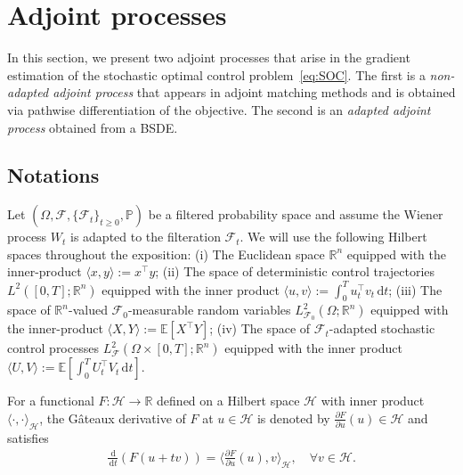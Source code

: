 \documentclass[letterpaper, 10 pt, conference]{ieeeconf}  %
\def\Re{\mathbb{R}}
\newcommand{\field}[1]{\mathbb{#1}}
\def\Re{\field{R}}
\def\Expect{{\mathbb E}}
\newcommand{\ud}{\,\mathrm{d}}
\def\Re{\mathbb{R}}
\renewcommand{\Re}{\mathbb{R}}
\begin{document}
\section{Adjoint processes}\label{sec:adjoint}
In this section, we present two adjoint processes that arise in the gradient estimation of the stochastic optimal control problem~\eqref{eq:SOC}.  
The first is a \emph{non-adapted adjoint process} that appears in adjoint matching methods and is obtained via pathwise differentiation of the objective.  
The second is an \emph{adapted adjoint process} obtained from a BSDE.  

\subsection{Notations} 
Let $(\Omega,\mathcal F, \{\mathcal F_t\}_{t\geq 0}, \mathbb P)$ be a filtered probability space and assume the Wiener process $W_t$ is adapted to the filteration $\mathcal F_t$. We will use the following Hilbert spaces throughout the exposition: (i) The  Euclidean space $\Re^n$ equipped with the inner-product $\langle x,y\rangle:=x^\top y$; (ii) The space of deterministic control trajectories $L^2([0,T];\mathbb R^n)$ equipped with the  inner product $\langle u,v \rangle := \int_0^T u_t^\top v_t \ud t$; (iii) The space of $\Re^n$-valued $\mathcal F_0$-measurable random variables $L^2_{\mathcal F_0}(\Omega;\Re^n)$ equipped with the inner-product $\langle X,Y \rangle := \Expect[X^\top Y]$; (iv) The space of $\mathcal F_t$-adapted  stochastic control processes $L^2_\mathcal F(\Omega \times [0,T];\Re^n)$ equipped with the inner product $\langle U,V\rangle :=\Expect[\int_0^T U_t^\top V_t \ud t] $. 

 For a functional $F:\mathcal H\to\mathbb R$ defined on a Hilbert space $\mathcal H$ with inner product $\langle\cdot,\cdot\rangle_{\mathcal H}$, the G\^ateaux derivative of $F$ at $u\in \mathcal H$ is denoted by  $\frac{\partial F}{\partial u}(u) \in \mathcal H$ and satisfies
\begin{align*}
    \frac{\ud}{\ud t}(F(u+tv)) = \langle \frac{\partial F}{\partial u}(u), v \rangle_{\mathcal H},\quad \forall v \in \mathcal H.  
\end{align*}
\end{document}
